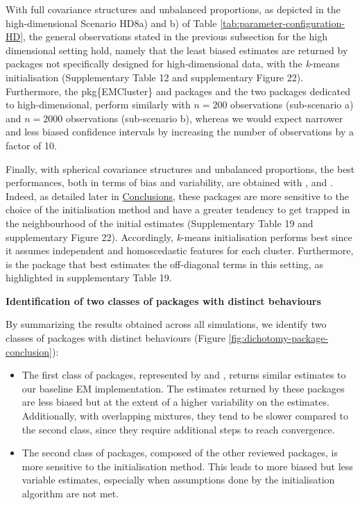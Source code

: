 With full covariance structures and unbalanced proportions, as depicted in the high-dimensional Scenario HD8a) and b) of Table \ref{tab:parameter-configuration-HD}, the general observations stated in the previous subsection for the high dimensional setting hold, namely that the least biased estimates are returned by packages not specifically designed for high-dimensional data, with the \emph{k}-means initialisation (Supplementary Table 12 and supplementary Figure 22). Furthermore, the pkg\{EMCluster\} and  packages and the two packages dedicated to high-dimensional, perform similarly with \(n=200\) observations (sub-scenario a) and \(n=2000\) observations (sub-scenario b), whereas we would expect narrower and less biased confidence intervals by increasing the number of observations by a factor of 10.

Finally, with spherical covariance structures and unbalanced proportions, the best performances, both in terms of bias and variability, are obtained with ,  and . Indeed, as detailed later in \protect\hyperlink{conclusions}{Conclusions}, these packages are more sensitive to the choice of the initialisation method and have a greater tendency to get trapped in the neighbourhood of the initial estimates (Supplementary Table 19 and supplementary Figure 22). Accordingly, \emph{k}-means initialisation performs best since it assumes independent and homoscedastic features for each cluster.
Furthermore,  is the package that best estimates the off-diagonal terms in this setting, as highlighted in supplementary Table 19.

\textbf{Identification of two classes of packages with distinct behaviours}

By summarizing the results obtained across all simulations, we identify two classes of packages with distinct behaviours (Figure
\ref{fig:dichotomy-package-conclusion}):

\begin{itemize}
\item
  The first class of packages, represented by  and , returns similar estimates to our baseline EM implementation. The estimates returned by these packages are less biased but at the extent of a higher variability on the estimates. Additionally, with overlapping mixtures, they tend to be slower compared to the second class, since they require additional steps to reach convergence.
\item
  The second class of packages, composed of the other
  reviewed packages, is more sensitive to the initialisation method. This leads to more
  biased but less variable estimates, especially when assumptions done by
  the initialisation algorithm are not met.
\end{itemize}

